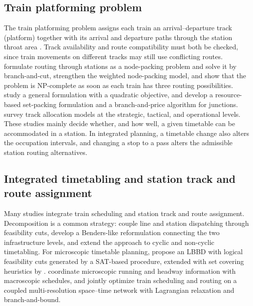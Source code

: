 \subsection{Train platforming problem}
The train platforming problem assigns each train an arrival--departure track (platform) together with its arrival and departure paths through the station throat area \citep{Caprara2011}. Track availability and route compatibility must both be checked, since train movements on different tracks may still use conflicting routes. \citet{Zwaneveld1996} formulate routing through stations as a node-packing problem and solve it by branch-and-cut, \citet{Zwaneveld2001} strengthen the weighted node-packing model, and \citet{Kroon1997} show that the problem is NP-complete as soon as each train has three routing possibilities. \citet{Caprara2011} study a general formulation with a quadratic objective, and \citet{Lusby2011} develop a resource-based set-packing formulation and a branch-and-price algorithm for junctions. \citet{Lusby2011survey} survey track allocation models at the strategic, tactical, and operational levels. These studies mainly decide whether, and how well, a given timetable can be accommodated in a station. In integrated planning, a timetable change also alters the occupation intervals, and changing a stop to a pass alters the admissible station routing alternatives.

\subsection{Integrated timetabling and station track and route assignment}
Many studies integrate train scheduling and station track and route assignment. Decomposition is a common strategy: \citet{Lamorgese2015} couple line and station dispatching through feasibility cuts, \citet{Lamorgese2016} develop a Benders-like reformulation connecting the two infrastructure levels, and \citet{Lamorgese2017} extend the approach to cyclic and non-cyclic timetabling. For microscopic timetable planning, \citet{Leutwiler2022} propose an LBBD with logical feasibility cuts generated by a SAT-based procedure, extended with set covering heuristics by \citet{Leutwiler2023}. \citet{Besinovic2016} coordinate microscopic running and headway information with macroscopic schedules, and \citet{Wang2023} jointly optimize train scheduling and routing on a coupled multi-resolution space--time network with Lagrangian relaxation and branch-and-bound.

